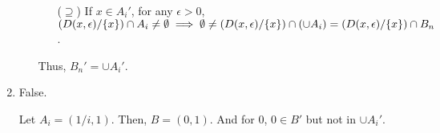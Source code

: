 \documentclass[12pt]{article}
\begin{document}
\begin{enumerate}
\begin{enumerate}
\begin{enumerate}
            \item[($\supseteq$)] If $x \in A_i'$, for any $\epsilon > 0$, $(D(x, \epsilon)/\lbrace x \rbrace) \cap A_i \neq \emptyset\implies \emptyset \neq (D(x, \epsilon) / \lbrace x \rbrace) \cap (\cup A_i) \\
            = (D(x, \epsilon) / \lbrace x \rbrace) \cap B_n$.
        \end{enumerate}

        Thus, $B_n' = \cup A_i'$.
    \end{enumerate}

    \item False.
    
    Let $A_i = (1/i, 1)$. Then, $B = (0, 1)$. And for $0$, $0 \in B'$ but not in $\cup A_i'$.
\end{enumerate}
\end{document}
